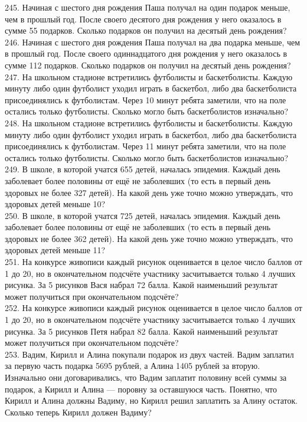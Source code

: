 \documentclass[12pt]{article}
\begin{document}
245. Начиная с шестого дня рождения Паша получал на один подарок меньше, чем в прошлый год. После своего десятого дня рождения у него оказалось в сумме 55 подарков. Сколько подарков он получил на десятый день рождения?\\
246. Начиная с шестого дня рождения Паша получал на два подарка меньше, чем в прошлый год. После своего одиннадцатого дня рождения у него оказалось в сумме 112 подарков. Сколько подарков он получил на десятый день рождения?\\
247. На школьном стадионе встретились футболисты и баскетболисты. Каждую минуту либо один футболист уходил играть в баскетбол, либо два баскетболиста присоединялись к футболистам. Через 10 минут ребята заметили, что на поле остались только футболисты. Сколько могло быть баскетболистов изначально?\\
248. На школьном стадионе встретились футболисты и баскетболисты. Каждую минуту либо один футболист уходил играть в баскетбол, либо два баскетболиста присоединялись к футболистам. Через 11 минут ребята заметили, что на поле остались только футболисты. Сколько могло быть баскетболистов изначально?\\
249. В школе, в которой учатся 655 детей, началась эпидемия. Каждый день заболевает более половины от ещё не заболевших (то есть в первый день здоровых не более 327 детей). На какой день уже точно можно утверждать, что здоровых детей меньше 10?\\
250. В школе, в которой учатся 725 детей, началась эпидемия. Каждый день заболевает более половины от ещё не заболевших (то есть в первый день здоровых не более 362 детей). На какой день уже точно можно утверждать, что здоровых детей меньше 11?\\
251. На конкурсе живописи каждый рисунок оценивается в целое число баллов от 1 до 20, но в окончательном подсчёте участнику засчитывается только 4 лучших рисунка. За 5 рисунков Вася набрал 72 балла. Какой наименьший результат может получиться при окончательном подсчёте?\\
252. На конкурсе живописи каждый рисунок оценивается в целое число баллов от 1 до 20, но в окончательном подсчёте участнику засчитывается только 4 лучших рисунка. За 5 рисунков Петя набрал 82 балла. Какой наименьший результат может получиться при окончательном подсчёте?\\
253. Вадим, Кирилл и Алина покупали подарок из двух частей. Вадим заплатил за первую часть подарка 5695 рублей, а Алина 1405 рублей за вторую. Изначально они договаривались, что Вадим заплатит половину всей суммы за подарок, а Кирилл и Алина --- поровну за оставшуюся часть. Понятно, что Кирилл и Алина должны Вадиму, но Кирилл решил заплатить за Алину остаток. Сколько теперь Кирилл должен Вадиму?\\
\end{document}
